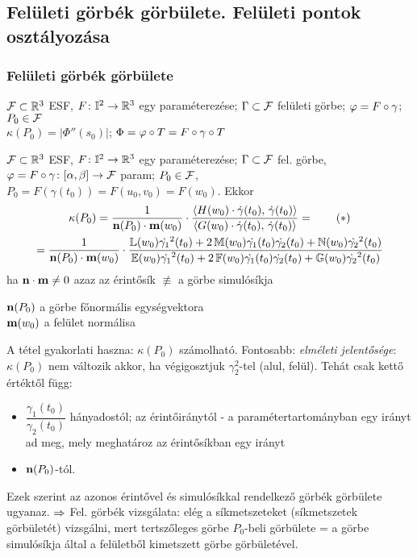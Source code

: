 \subsection{Felületi görbék görbülete. Felületi pontok osztályozása}


\subsubsection{Felületi görbék görbülete}
$\mathcal F\subset\mathbb{R}^3$ ESF, $F\colon \mathbb I^2\to\mathbb{R}^3$ egy paraméterezése; $\Gamma\subset\mathcal F$ felületi görbe;
$\varphi=F\circ\gamma$; $P_0\in\mathcal F$\\
$\kappa(P_0) = |\Phi''(s_0)|$; $\Phi=\varphi\circ T= F\circ\gamma\circ T$

\begin{te}
  $\mathcal F\subset\mathbb{R}^3$ ESF, $F\colon \mathbb I^2\to\mathbb{R}^3$ egy paraméterezése; $\Gamma\subset \mathcal F$ fel. görbe,\\ $\varphi =
  F\circ\gamma\colon[\alpha,\beta]\to\mathcal F$ param; $P_0\in\mathcal F$, $P_0 = F(\gamma(t_0))=F(u_0,v_0)=F(w_0)$.
  Ekkor
  \begin{gather*}
    \kappa(P_0)=\dfrac1{\mathbf{n}(P_0) \cdot\mathbf{m}(w_0)}\cdot\dfrac{\langle H(w_0)\cdot
	\Dot\gamma(t_0),\,\Dot\gamma(t_0)\rangle}{\langle G(w_0)\cdot \Dot\gamma(t_0),\,\Dot\gamma(t_0)\rangle} = \tag{$*$}\label{eq:*}\\
    = \dfrac1{\mathbf{n}(P_0) \cdot\mathbf{m}(w_0)} \cdot
    \dfrac{\mathbb L(w_0)\Dot{\gamma_1}^2(t_0) +2\,\mathbb M(w_0)\Dot{\gamma_1}(t_0)\Dot{\gamma_2}(t_0)
      +\mathbb N(w_0)\Dot{\gamma_2}^2(t_0)}{\mathbb E(w_0)\Dot{\gamma_1}^2(t_0) +2\,\mathbb F(w_0)\Dot{\gamma_1}(t_0)\Dot{\gamma_2}(t_0)
      +\mathbb G(w_0)\Dot{\gamma_2}^2(t_0)}
  \end{gather*}
  ha $\mathbf{n} \cdot \mathbf{m} \neq 0$ azaz az érintősík $\not\equiv$ a görbe simulósíkja
\end{te}

\begin{Megj}
  \item $\mathbf{n}(P_0)$ a görbe főnormális egységvektora\\
    $\mathbf{m} (w_0)$ a felület normálisa
  \item A tétel gyakorlati haszna: $\kappa(P_0)$ számolható. Fontosabb: \emph{elméleti jelentősége}:
    $\kappa(P_0)$ nem változik akkor, ha végigosztjuk $\gamma_2^2$-tel (alul, felül). Tehát csak kettő értéktől függ:
    \begin{itemize}
      \item $\dfrac{\gamma_1(t_0)}{\gamma_2(t_0)}$ hányadostól; az érintőiránytól - a paramétertartományban egy irányt ad
	meg, mely meghatároz az érintősíkban egy irányt
      \item $\mathbf{n}(P_0)$-tól.
    \end{itemize}
   
    Ezek szerint az azonos érintővel és simulósíkkal rendelkező görbék görbülete ugyanaz. $\Rightarrow$ Fel. görbék vizsgálata:
    elég a síkmetszeteket (síkmetszetek görbületét) vizsgálni, mert tertszőleges görbe $P_0$-beli görbülete = a görbe
    simulósíkja által a felületből kimetszett görbe görbületével.
\end{Megj}


